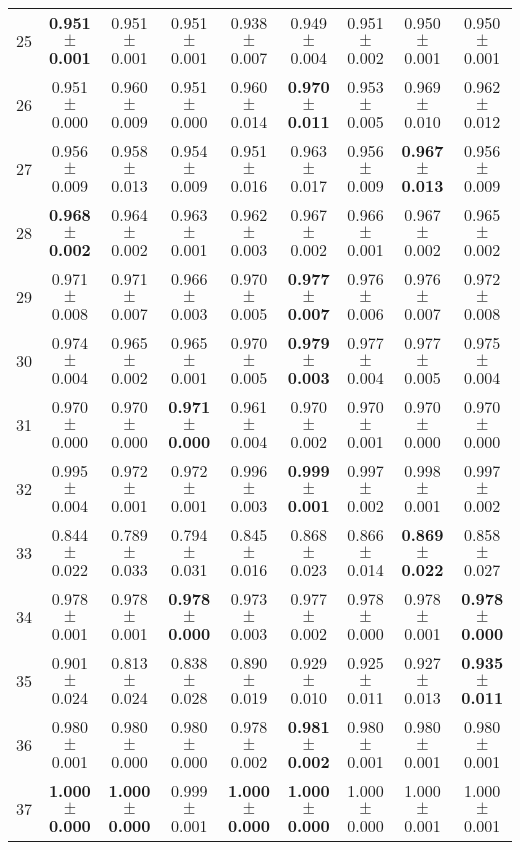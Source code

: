 \begin{table}[!ht]
{\begin{tabular}{r c c c c c c c c}
25 & \textbf{0.951 $\pm$ 0.001} & 0.951 $\pm$ 0.001 & 0.951 $\pm$ 0.001 & 0.938 $\pm$ 0.007 & 0.949 $\pm$ 0.004 & 0.951 $\pm$ 0.002 & 0.950 $\pm$ 0.001 & 0.950 $\pm$ 0.001 \\
26 & 0.951 $\pm$ 0.000 & 0.960 $\pm$ 0.009 & 0.951 $\pm$ 0.000 & 0.960 $\pm$ 0.014 & \textbf{0.970 $\pm$ 0.011} & 0.953 $\pm$ 0.005 & 0.969 $\pm$ 0.010 & 0.962 $\pm$ 0.012 \\
27 & 0.956 $\pm$ 0.009 & 0.958 $\pm$ 0.013 & 0.954 $\pm$ 0.009 & 0.951 $\pm$ 0.016 & 0.963 $\pm$ 0.017 & 0.956 $\pm$ 0.009 & \textbf{0.967 $\pm$ 0.013} & 0.956 $\pm$ 0.009 \\
28 & \textbf{0.968 $\pm$ 0.002} & 0.964 $\pm$ 0.002 & 0.963 $\pm$ 0.001 & 0.962 $\pm$ 0.003 & 0.967 $\pm$ 0.002 & 0.966 $\pm$ 0.001 & 0.967 $\pm$ 0.002 & 0.965 $\pm$ 0.002 \\
29 & 0.971 $\pm$ 0.008 & 0.971 $\pm$ 0.007 & 0.966 $\pm$ 0.003 & 0.970 $\pm$ 0.005 & \textbf{0.977 $\pm$ 0.007} & 0.976 $\pm$ 0.006 & 0.976 $\pm$ 0.007 & 0.972 $\pm$ 0.008 \\
30 & 0.974 $\pm$ 0.004 & 0.965 $\pm$ 0.002 & 0.965 $\pm$ 0.001 & 0.970 $\pm$ 0.005 & \textbf{0.979 $\pm$ 0.003} & 0.977 $\pm$ 0.004 & 0.977 $\pm$ 0.005 & 0.975 $\pm$ 0.004 \\
31 & 0.970 $\pm$ 0.000 & 0.970 $\pm$ 0.000 & \textbf{0.971 $\pm$ 0.000} & 0.961 $\pm$ 0.004 & 0.970 $\pm$ 0.002 & 0.970 $\pm$ 0.001 & 0.970 $\pm$ 0.000 & 0.970 $\pm$ 0.000 \\
32 & 0.995 $\pm$ 0.004 & 0.972 $\pm$ 0.001 & 0.972 $\pm$ 0.001 & 0.996 $\pm$ 0.003 & \textbf{0.999 $\pm$ 0.001} & 0.997 $\pm$ 0.002 & 0.998 $\pm$ 0.001 & 0.997 $\pm$ 0.002 \\
33 & 0.844 $\pm$ 0.022 & 0.789 $\pm$ 0.033 & 0.794 $\pm$ 0.031 & 0.845 $\pm$ 0.016 & 0.868 $\pm$ 0.023 & 0.866 $\pm$ 0.014 & \textbf{0.869 $\pm$ 0.022} & 0.858 $\pm$ 0.027 \\
34 & 0.978 $\pm$ 0.001 & 0.978 $\pm$ 0.001 & \textbf{0.978 $\pm$ 0.000} & 0.973 $\pm$ 0.003 & 0.977 $\pm$ 0.002 & 0.978 $\pm$ 0.000 & 0.978 $\pm$ 0.001 & \textbf{0.978 $\pm$ 0.000} \\
35 & 0.901 $\pm$ 0.024 & 0.813 $\pm$ 0.024 & 0.838 $\pm$ 0.028 & 0.890 $\pm$ 0.019 & 0.929 $\pm$ 0.010 & 0.925 $\pm$ 0.011 & 0.927 $\pm$ 0.013 & \textbf{0.935 $\pm$ 0.011} \\
36 & 0.980 $\pm$ 0.001 & 0.980 $\pm$ 0.000 & 0.980 $\pm$ 0.000 & 0.978 $\pm$ 0.002 & \textbf{0.981 $\pm$ 0.002} & 0.980 $\pm$ 0.001 & 0.980 $\pm$ 0.001 & 0.980 $\pm$ 0.001 \\
37 & \textbf{1.000 $\pm$ 0.000} & \textbf{1.000 $\pm$ 0.000} & 0.999 $\pm$ 0.001 & \textbf{1.000 $\pm$ 0.000} & \textbf{1.000 $\pm$ 0.000} & 1.000 $\pm$ 0.000 & 1.000 $\pm$ 0.001 & 1.000 $\pm$ 0.001 \\

\end{tabular}}
\end{table}
